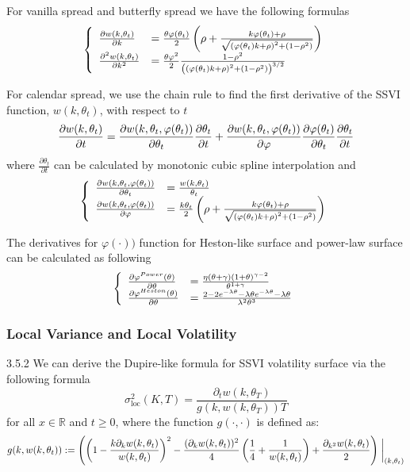 \documentclass[11pt]{article}
\numberwithin{equation}{section}
\theoremstyle{remark}
\begin{document}
For vanilla spread and butterfly spread we have the following formulas
$$
\left\{
\begin{array}{ll}
    \pdv{w(k,\theta_t)}{k} & = \frac{\theta \varphi(\theta_t)}{2} \left( \rho + \frac{k \varphi(\theta_t) + \rho}{\sqrt{ \left( \varphi(\theta_t) k + \rho \right)^2 + \left(1-\rho^2 \right)}} \right)\\
    \pdv[2]{w(k,\theta_t)}{k} & = \frac{\theta\varphi^2}{2}\frac{1-\rho^2}
    {\left( \left( \varphi(\theta_t) k + \rho \right)^2 + \left(1-\rho^2 \right) \right)^{3/2}}
\end{array}
\right.
$$

For calendar spread, we use the chain rule to find the first derivative of the SSVI function, $w(k,\theta_t)$, with respect to $t$
$$ \pdv{w(k,\theta_t)}{t} = \pdv{w(k, \theta_t, \varphi(\theta_t))}{\theta_t} \pdv{\theta_t}{t} + \pdv{w(k, \theta_t, \varphi(\theta_t))}{\varphi} \pdv{\varphi(\theta_t)}{\theta_t} \pdv{\theta_t}{t}$$
where $\frac{\partial \theta_t}{\partial t}$ can be calculated by monotonic cubic spline interpolation and
$$
\left\{
\begin{array}{ll}
    \pdv{w(k, \theta_t, \varphi(\theta_t))}{\theta_t} & = \frac{w(k,\theta_t)}{\theta_t}\\
    \pdv{w(k, \theta_t, \varphi(\theta_t))}{\varphi} & = \frac{k\theta_t}{2} \left( \rho + \frac{k \varphi(\theta_t) + \rho}{\sqrt{ \left( \varphi(\theta_t) k + \rho \right)^2 + \left(1-\rho^2 \right)}} \right)
\end{array}
\right.
$$

The derivatives for $\varphi(\cdot))$ function for Heston-like surface and power-law surface can be calculated as following
$$
\left\{
\begin{array}{ll}
    \pdv{\varphi^{Power}(\theta)}{\theta} & = \frac{\eta\left(\theta+\gamma\right)\left(1+\theta\right)^{\gamma-2}}{\theta^{1+\gamma}}\\
    \pdv{\varphi^{Heston}(\theta)}{\theta} & = \frac{2-2 e^{-\lambda\theta} - \lambda \theta e^{-\lambda \theta} - \lambda \theta}{\lambda^2 \theta^3}
\end{array}
\right.
$$

\subsubsection{Local Variance and Local Volatility}{3.5.2}
We can derive the Dupire-like formula for SSVI volatility surface via the following formula
$$\sigma_{\mathrm{loc}}^2(K, T) = \frac{\partial_{t}w(k, \theta_{T})}{g(k, w(k, \theta_{T})) T}$$
for all $x\in\mathbb{R}$ and $t\geq 0$, where the function $g(\cdot, \cdot)$ is defined as:
$$ g(k, w(k, \theta_{t})) := \left(\left(1 - \frac{k\partial_k w(k, \theta_{t})}{w(k, \theta_{t})}\right)^2 -\frac{(\partial_k w(k, \theta_{t}))^2}{4}\left(\frac{1}{4}+\frac{1}{w(k, \theta_{t})}\right) + \frac{\partial_{k^2} w(k, \theta_{t})}{2}\right) \eval_{(k,\theta_t)}$$
\end{document}
